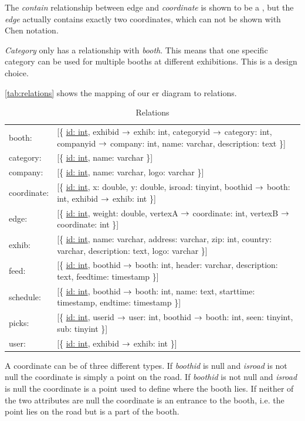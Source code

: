 The \textit{contain} relationship between edge and \textit{coordinate} is shown to be a , but the \textit{edge} actually contains exactly two coordinates, which can not be shown with Chen notation.

\textit{Category} only has a relationship with \textit{booth}. This means that one specific category can be used for multiple booths at different exhibitions. This is a design choice.

\autoref{tab:relations} shows the mapping of our \ac{er} diagram to relations.

\newcommand{\relation}[1]{[\{ #1 \}]\\}

\begin{table}[H]
\centering
\small
\begin{tabular}{p{1.2cm} p{9.6cm}}
booth: & \relation{\underline{id: int}, exhibid $\rightarrow$ exhib: int, categoryid $\rightarrow$ category: int, companyid $\rightarrow$ company: int, name: varchar, description: text}
category: & \relation{\underline{id: int}, name: varchar}
company: & \relation{\underline{id: int}, name: varchar, logo: varchar}
coordinate: & \relation{\underline{id: int}, x: double, y: double, isroad: tinyint, boothid $\rightarrow$ booth: int, exhibid $\rightarrow$ exhib: int}
edge: & \relation{\underline{id: int}, weight: double, vertexA $\rightarrow$ coordinate: int, vertexB $\rightarrow$ coordinate: int}
exhib: & \relation{\underline{id: int}, name: varchar, address: varchar, zip: int, country: varchar, description: text, logo: varchar}
feed: & \relation{\underline{id: int}, boothid $\rightarrow$ booth: int, header: varchar, description: text, feedtime: timestamp}
schedule: & \relation{\underline{id: int}, boothid $\rightarrow$ booth: int, name: text, starttime: timestamp, endtime: timestamp}
picks: & \relation{\underline{id: int}, userid $\rightarrow$ user: int, boothid $\rightarrow$ booth: int, seen: tinyint, sub: tinyint}
user: & \relation{\underline{id: int}, exhibid $\rightarrow$ exhib: int}
\end{tabular}
\caption{Relations}
\label{tab:relations}
\end{table}
A coordinate can be of three different types. If \textit{boothid} is null and \textit{isroad} is not null the coordinate is simply a point on the road. If \textit{boothid} is not null and \textit{isroad} is null the coordinate is a point used to define where the booth lies. If neither of the two attributes are null the coordinate is an entrance to the booth, i.e. the point lies on the road but is a part of the booth.

